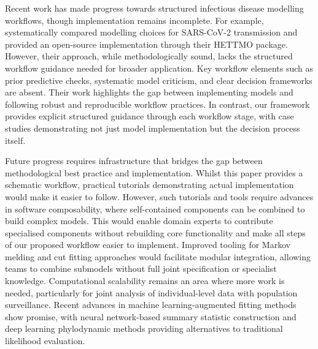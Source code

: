 \documentclass{article}
\begin{document}
Recent work has made progress towards structured infectious disease modelling workflows, though implementation remains incomplete.
For example, \citet{bouman2024bayesian} systematically compared modelling choices for SARS-CoV-2 transmission and provided an open-source implementation through their HETTMO package.
However, their approach, while methodologically sound, lacks the structured workflow guidance needed for broader application.
Key workflow elements such as prior predictive checks, systematic model criticism, and clear decision frameworks are absent.
Their work highlights the gap between implementing models and following robust and reproducible workflow practices.
In contrast, our framework provides explicit structured guidance through each workflow stage, with case studies demonstrating not just model implementation but the decision process itself.


Future progress requires infrastructure that bridges the gap between methodological best practice and implementation.
Whilst this paper provides a schematic workflow, practical tutorials demonstrating actual implementation would make it easier to follow.
However, such tutorials and tools require advances in software composability, where self-contained components can be combined to build complex models.
This would enable domain experts to contribute specialised components without rebuilding core functionality and make all steps of our proposed workflow easier to implement.
Improved tooling for Markov melding and cut fitting approaches would facilitate modular integration, allowing teams to combine submodels without full joint specification or specialist knowledge.
Computational scalability remains an area where more work is needed, particularly for joint analysis of individual-level data with population surveillance.
Recent advances in machine learning-augmented fitting methods show promise, with neural network-based summary statistic construction \citep{raynal2019abc} and deep learning phylodynamic methods \citep{voznica2022deep} providing alternatives to traditional likelihood evaluation.

\end{document}
